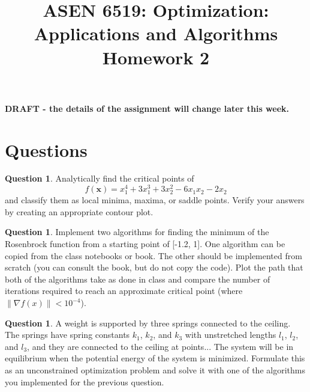 \documentclass{article}
\title{ASEN 6519: Optimization: Applications and Algorithms\\
       Homework 2}
\theoremstyle{definition}
\newtheorem{question}[thm]{Question}
\begin{document}
\maketitle

\begin{center}
    \large{\textbf{DRAFT - the details of the assignment will change later this week.}}
\end{center}

\section{Questions}

\begin{question}
    Analytically find the critical points of
    $$f(\mathbf{x}) = x_1^4 + 3 x_1^3 + 3 x_2^2 - 6 x_1 x_2 - 2 x_2$$
    and classify them as local minima, maxima, or saddle points.
    Verify your answers by creating an appropriate contour plot.
\end{question}

\begin{question}
    Implement two algorithms for finding the minimum of the Rosenbrock function from a starting point of [-1.2, 1]. One algorithm can be copied from the class notebooks or book. The other should be implemented from scratch (you can consult the book, but do not copy the code). Plot the path that both of the algorithms take as done in class and compare the number of iterations required to reach an approximate critical point (where $\lVert \nabla f(x) \rVert < 10^{-4}$).
\end{question}

\begin{question}
    A weight is supported by three springs connected to the ceiling. The springs have spring constants $k_1$, $k_2$, and $k_3$ with unstretched lengths $l_1$, $l_2$, and $l_3$, and they are connected to the ceiling at points... The system will be in equilibrium when the potential energy of the system is minimized. Formulate this as an unconstrained optimization problem and solve it with one of the algorithms you implemented for the previous question.
\end{question}
\end{document}
